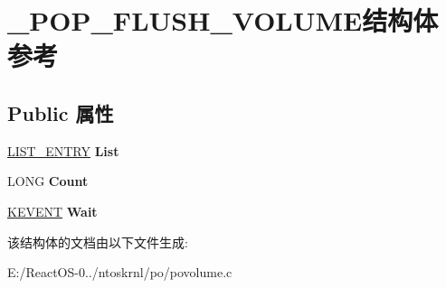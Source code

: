 \hypertarget{struct___p_o_p___f_l_u_s_h___v_o_l_u_m_e}{}\section{\+\_\+\+P\+O\+P\+\_\+\+F\+L\+U\+S\+H\+\_\+\+V\+O\+L\+U\+M\+E结构体 参考}
\label{struct___p_o_p___f_l_u_s_h___v_o_l_u_m_e}
\subsection*{Public 属性}
\begin{DoxyCompactItemize}
\item 
\mbox{\label{struct___p_o_p___f_l_u_s_h___v_o_l_u_m_e_a0456b636a4cc014db89817524d91e548}} 
\hyperlink{struct___l_i_s_t___e_n_t_r_y}{L\+I\+S\+T\+\_\+\+E\+N\+T\+RY} {\bfseries List}
\item 
\mbox{\label{struct___p_o_p___f_l_u_s_h___v_o_l_u_m_e_a7915f1666bb1389c8c2f32ffa68a35e1}} 
L\+O\+NG {\bfseries Count}
\item 
\mbox{\label{struct___p_o_p___f_l_u_s_h___v_o_l_u_m_e_aabd3df875b093fed7e600cff30c187c7}} 
\hyperlink{struct___k_e_v_e_n_t}{K\+E\+V\+E\+NT} {\bfseries Wait}
\end{DoxyCompactItemize}


该结构体的文档由以下文件生成\+:\begin{DoxyCompactItemize}
\item 
E\+:/\+React\+O\+S-\/0../ntoskrnl/po/povolume.\+c\end{DoxyCompactItemize}
